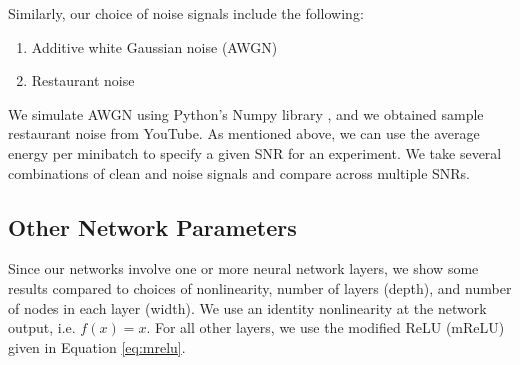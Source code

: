 Similarly, our choice of noise signals include the following:

\begin{enumerate}
    \item Additive white Gaussian noise (AWGN)
    \item Restaurant noise
\end{enumerate}

We simulate AWGN using Python's Numpy library \cite{scipy}, and we obtained sample restaurant noise from YouTube. \cite{golf} As mentioned above, we can use the average energy per minibatch to specify a given SNR for an experiment. We take several combinations of clean and noise signals and compare across multiple SNRs.

\subsection{Other Network Parameters}
Since our networks involve one or more neural network layers, we show some results compared to choices of nonlinearity, number of layers (depth), and number of nodes in each layer (width). We use an identity nonlinearity at the network output, i.e. $f(x)=x$. For all other layers, we use the modified ReLU (mReLU) given in Equation \ref{eq:mrelu}.
